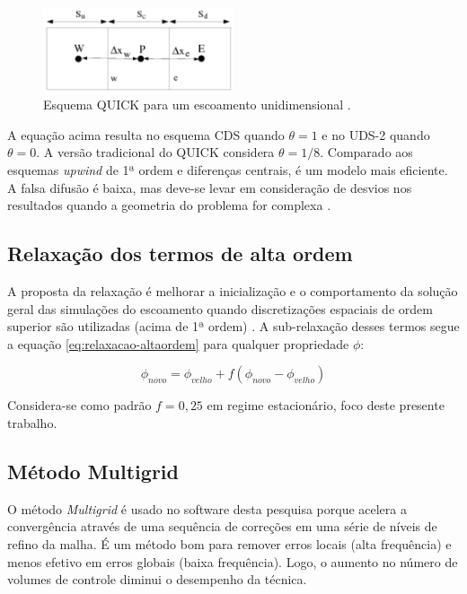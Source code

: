 \begin{figure}[!ht]
	\centering
	\includegraphics[width=0.5\textwidth]{foto03-quick-1d.png}  
	\caption[Esquema QUICK para um escoamento unidimensional.]{Esquema QUICK para um escoamento unidimensional \cite{fluent2021ansys}.}
	\label{fig:ansys-QUICK}
\end{figure}

A equação acima resulta no esquema CDS quando $\theta = 1$ e no UDS-2 quando $\theta = 0$. A versão tradicional do QUICK \cite{Leonard1979} considera $\theta = 1/8$. Comparado aos esquemas \textit{upwind} de 1ª ordem e diferenças centrais, é um modelo mais eficiente. A falsa difusão é baixa, mas deve-se levar em consideração de desvios nos resultados quando a geometria do problema for complexa \cite{Leonard1979}.

\subsection{Relaxação dos termos de alta ordem}

A proposta da relaxação é melhorar a inicialização e o comportamento da solução geral das simulações do escoamento quando discretizações espaciais de ordem superior são utilizadas (acima de 1ª ordem) \cite{fluent2021ansys}. A sub-relaxação desses termos segue a equação \ref{eq:relaxacao-altaordem} para qualquer propriedade $\phi$:

\begin{equation}
    \label{eq:relaxacao-altaordem}
    \phi_{novo} = \phi_{velho} + f(\phi_{novo} - \phi_{velho})
\end{equation}

Considera-se como padrão $f = 0,25$ em regime estacionário, foco deste presente trabalho.

\subsection{Método Multigrid}

O método \textit{Multigrid} \cite{Hutchinson1986} é usado no software desta pesquisa porque acelera a convergência através de uma sequência de correções em uma série de níveis de refino da malha. É um método bom para remover erros locais (alta frequência) e menos efetivo em erros globais (baixa frequência). Logo, o aumento no número de volumes de controle diminui o desempenho da técnica.

